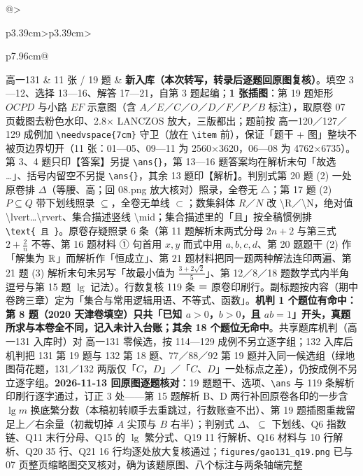 \documentclass[a4paper,11pt]{article}
\begin{document}
\begin{xltabular}{\textwidth}{@{}>{\raggedright\arraybackslash}p{3.39cm}>{\centering\arraybackslash}p{3.39cm}>{\raggedright\arraybackslash}p{7.96cm}@{}}
高一131 & 11 张 / 19 题 & \textbf{新入库（本次转写，转录后逐题回原图复核）}。填空 3---12、选择 13---16、解答 17---21，自第 3 题起编；\textbf{1 张插图}：第 19 题矩形 \(OCPD\) 与小路 \(EF\) 示意图（含 \(A\)／\(E\)／\(C\)／\(O\)／\(D\)／\(F\)／\(P\)／\(B\) 标注），取原卷 07 页截图去粉色水印、2.8$\times$ LANCZOS 放大，三版都出；题前按 高一120／127／129 成例加 \texttt{\textbackslash{}needvspace\{7cm\}} 守卫（放在 \texttt{\textbackslash{}item} 前），保证「题干 + 图」整块不被页边界切开（11 张：01---05、09---11 为 2560$\times$3620，06---08 为 4762$\times$6735）。第 3、4 题只印【答案】另提 \texttt{\textbackslash{}ans\{\}}，第 13---16 题答案均在解析末句「故选 \ldots」、括号内留空不另提 \texttt{\textbackslash{}ans\{\}}，其余 13 题印【解析】。判别式第 20 题 (2) 一处原卷排 \(\Delta\)（等腰、高；回 08.png 放大核对）照录，全卷无 \(\triangle\)；第 17 题 (2) \(P\subseteq\allowbreak  Q\) 带下划线照录 \(\subseteq\allowbreak \)，全卷无单线 \(\subset\allowbreak \)；数集斜体 \(R\)／\(N\) 改 \textbackslash R／\textbackslash N，绝对值 \textbackslash lvert\ldots\textbackslash rvert、集合描述竖线 \textbackslash mid；集合描述里的「且」按全稿惯例排 \texttt{\textbackslash{}text\{\ 且\ \}}。原卷存疑照录 6 条（第 11 题解析末两式分母 \(2n+\allowbreak 2\) 与第三式 \(2+\allowbreak \frac2n\) 不等、第 16 题材料 ① 句首用 \(x,y\) 而式中用 \(a,b,c,d\)、第 20 题题干 (2) 作「解集为 \(\mathbb{R}\)」而解析作「恒成立」、第 21 题材料把同一题两种解法连印两遍、第 21 题 (3) 解析末句未另写「故最小值为 \(\frac{3+\allowbreak 2\sqrt2}{5}\)」、第 12／8／18 题数学式内半角逗号与第 15 题 \(\lg\) 记法）。行数复核 119 条 ＝ 原卷印刷行。副标题按内容（期中卷跨三章）定为「集合与常用逻辑用语、不等式、函数」。\textbf{机判 1 个题位有命中：第 8 题（2020 天津卷填空）只共「已知 \(a>0\)，\(b>0\)，且 \(ab=\allowbreak 1\)」开头，真题所求与本卷全不同，记入未计入台账；其余 18 个题位无命中}。共享题库机判（高一131 入库时）对 高一131 零候选，按 114---129 成例不另立逐字组；132 入库后机判把 131 第 19 题与 132 第 18 题、77／88／92 第 19 题并入同一候选组（绿地图荷花题，131／132 两版仅「\(C\)，\(D\)」／「\(C\)、\(D\)」一处标点之差），仍按成例不另立逐字组。\textbf{2026-11-13 回原图逐题核对}：19 题题干、选项、\texttt{\textbackslash{}ans} 与 119 条解析印刷行逐字通过，订正 3 处------第 15 题解析 B、D 两行补回原卷各印的一步含 \(\lg m\) 换底繁分数（本稿初转顺手去重跳过，行数账查不出）、第 19 题插图重裁留足上／右余量（初裁切掉 \(A\) 尖顶与 \(B\) 右半）；判别式 \(\Delta\)、\(\subseteq\allowbreak \) 下划线、Q6 指数链、Q11 末行分母、Q15 的 \(\lg\) 繁分式、Q19 11 行解析、Q16 材料与 10 行解析、Q20 35 行、Q21 16 行均逐处放大复核通过；\texttt{figures/\allowbreak{}gao131\_q19.png} 已与 07 页整页缩略图交叉核对，确为该题原图、八个标注与两条轴端完整 \\ \addlinespace[1pt]

\end{xltabular}
\end{document}

